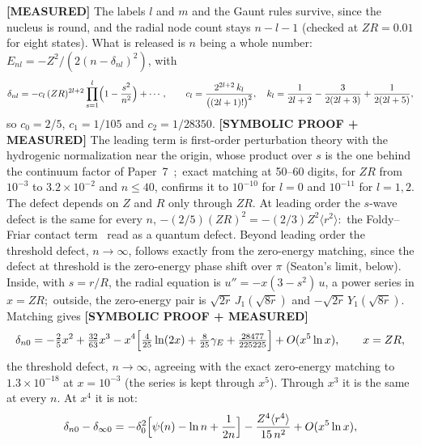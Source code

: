 \documentclass[twocolumn,prc,amsmath,amssymb,superscriptaddress]{revtex4-2}
\begin{document}
\textbf{[MEASURED]} The labels $l$ and $m$ and the Gaunt rules survive, since the nucleus is round, and the radial node count stays $n - l - 1$ (checked at $ZR = 0.01$ for eight states). What is released is $n$ being a whole number:\ $E_{nl} = -Z^2/(2(n - \delta_{nl})^2)$, with
\begin{equation}
\delta_{nl} = -c_l\,(ZR)^{2l+2}\prod_{s=1}^{l}\Bigl(1 - \frac{s^2}{n^2}\Bigr) + \cdots,
\qquad
c_l = \frac{2^{2l+2}\,k_l}{\bigl((2l+1)!\bigr)^2},
\quad
k_l = \frac{1}{2l+2} - \frac{3}{2(2l+3)} + \frac{1}{2(2l+5)},
\label{eq:defect}
\end{equation}
so $c_0 = 2/5$, $c_1 = 1/105$ and $c_2 = 1/28350$. \textbf{[SYMBOLIC PROOF + MEASURED]} The leading term is first-order perturbation theory with the hydrogenic normalization near the origin, whose product over $s$ is the one behind the continuum factor of Paper~7~\cite{Paper7};\ exact matching at 50--60 digits, for $ZR$ from $10^{-3}$ to $3.2\times 10^{-2}$ and $n \le 40$, confirms it to $10^{-10}$ for $l = 0$ and $10^{-11}$ for $l = 1, 2$. The defect depends on $Z$ and $R$ only through $ZR$. At leading order the $s$-wave defect is the same for every $n$, $-(2/5)(ZR)^2 = -(2/3)Z^2\langle r^2\rangle$:\ the Foldy--Friar contact term~\cite{Friar1979} read as a quantum defect. Beyond leading order the threshold defect, $n \to \infty$, follows exactly from the zero-energy matching, since the defect at threshold is the zero-energy phase shift over $\pi$ (Seaton's limit, below). Inside, with $s = r/R$, the radial equation is $u'' = -x(3 - s^2)\,u$, a power series in $x = ZR$;\ outside, the zero-energy pair is $\sqrt{2r}\,J_1(\sqrt{8r})$ and $-\sqrt{2r}\,Y_1(\sqrt{8r})$. Matching gives \textbf{[SYMBOLIC PROOF + MEASURED]}
\begin{equation}
\delta_{n0} = -\tfrac{2}{5}x^2 + \tfrac{32}{63}x^3 - x^4\Bigl[\tfrac{4}{25}\ln(2x) + \tfrac{8}{25}\gamma_E + \tfrac{28477}{225225}\Bigr] + O(x^5\ln x),
\qquad x = ZR,
\label{eq:defect_s}
\end{equation}
the threshold defect, $n \to \infty$, agreeing with the exact zero-energy matching to $1.3\times 10^{-18}$ at $x = 10^{-3}$ (the series is kept through $x^5$). Through $x^3$ it is the same at every $n$. At $x^4$ it is not:
\begin{equation}
\delta_{n0} - \delta_{\infty 0} = -\delta_0^2\Bigl[\psi(n) - \ln n + \frac{1}{2n}\Bigr] - \frac{Z^4\langle r^4\rangle}{15\,n^2} + O(x^5\ln x),
\label{eq:defect_n4}
\end{equation}
\end{document}
